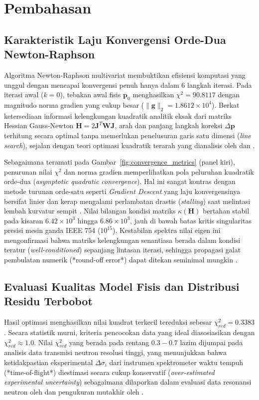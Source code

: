 \section{Pembahasan}

\subsection*{Karakteristik Laju Konvergensi Orde-Dua Newton-Raphson}
Algoritma Newton-Raphson multivariat membuktikan efisiensi komputasi yang unggul dengan mencapai konvergensi penuh hanya dalam 6 langkah iterasi. Pada iterasi awal ($k=0$), tebakan awal fisis $\mathbf{p}_0$ menghasilkan $\chi^2 = 90.8117$ dengan magnitudo norma gradien yang cukup besar ($\|\mathbf{g}\|_2 = 1.8612 \times 10^4$). Berkat ketersediaan informasi kelengkungan kuadratik analitik eksak dari matriks Hessian Gauss-Newton $\mathbf{H} = 2\mathbf{J}^T\mathbf{W}\mathbf{J}$, arah dan panjang langkah koreksi $\Delta\mathbf{p}$ terhitung secara optimal tanpa memerlukan penelusuran garis satu dimensi (\textit{line search}), sejalan dengan teori optimasi kuadratik terarah yang dianalisis oleh \textcite{nocedal2006numerical} dan \textcite{kelley1999iterative}.

Sebagaimana teramati pada Gambar~\ref{fig:convergence_metrics} (panel kiri), penurunan nilai $\chi^2$ dan norma gradien memperlihatkan pola peluruhan kuadratik orde-dua (\textit{asymptotic quadratic convergence}). Hal ini sangat kontras dengan metode turunan orde-satu seperti \textit{Gradient Descent} yang laju konvergensinya bersifat linier dan kerap mengalami perlambatan drastis (\textit{stalling}) saat melintasi lembah kurvatur sempit \parencite{nocedal2006numerical}. Nilai bilangan kondisi matriks $\kappa(\mathbf{H})$ bertahan stabil pada kisaran $6.42 \times 10^3$ hingga $6.86 \times 10^3$, jauh di bawah batas kritis singularitas presisi mesin ganda IEEE 754 ($10^{15}$). Kestabilan spektra nilai eigen ini mengonfirmasi bahwa matriks kelengkungan senantiasa berada dalam kondisi teratur (\textit{well-conditioned}) sepanjang lintasan iterasi, sehingga propagasi galat pembulatan numerik (*round-off error*) dapat ditekan seminimal mungkin \parencite{higham2002accuracy}.

\subsection*{Evaluasi Kualitas Model Fisis dan Distribusi Residu Terbobot}
Hasil optimasi menghasilkan nilai kuadrat terkecil tereduksi sebesar $\chi^2_{red} = 0.3383$. Secara statistik murni, kriteria pencocokan data yang ideal diasosiasikan dengan $\chi^2_{red} \approx 1.0$. Nilai $\chi^2_{red}$ yang berada pada rentang $0.3 - 0.7$ lazim dijumpai pada analisis data transmisi neutron resolusi tinggi, yang menunjukkan bahwa ketidakpastian eksperimental $\Delta\sigma_i$ dari instrumen spektrometer waktu tempuh (*time-of-flight*) diestimasi secara cukup konservatif (\textit{over-estimated experimental uncertainty}) sebagaimana dilaporkan dalam evaluasi data resonansi neutron oleh \textcite{frohner2000evaluation} dan pengukuran mutakhir oleh \textcite{danon2018high}.

